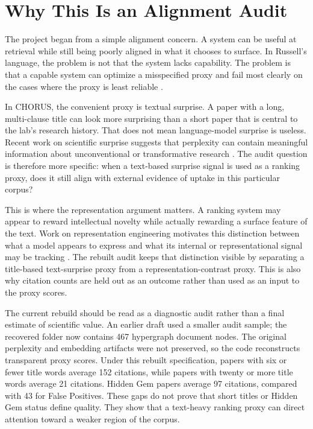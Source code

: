 \documentclass[11pt]{article}
\begin{document}
\section{Why This Is an Alignment Audit}

The project began from a simple alignment concern. A system can be useful at retrieval while still being poorly aligned in what it chooses to surface. In Russell's language, the problem is not that the system lacks capability. The problem is that a capable system can optimize a misspecified proxy and fail most clearly on the cases where the proxy is least reliable \citep{russell2021human}.

In CHORUS, the convenient proxy is textual surprise. A paper with a long, multi-clause title can look more surprising than a short paper that is central to the lab's research history. That does not mean language-model surprise is useless. Recent work on scientific surprise suggests that perplexity can contain meaningful information about unconventional or transformative research \citep{zhang2025perplexity}. The audit question is therefore more specific: when a text-based surprise signal is used as a ranking proxy, does it still align with external evidence of uptake in this particular corpus?

This is where the representation argument matters. A ranking system may appear to reward intellectual novelty while actually rewarding a surface feature of the text. Work on representation engineering motivates this distinction between what a model appears to express and what its internal or representational signal may be tracking \citep{zou2023representation}. The rebuilt audit keeps that distinction visible by separating a title-based text-surprise proxy from a representation-contrast proxy. This is also why citation counts are held out as an outcome rather than used as an input to the proxy scores.

The current rebuild should be read as a diagnostic audit rather than a final estimate of scientific value. An earlier draft used a smaller audit sample; the recovered folder now contains 467 hypergraph document nodes. The original perplexity and embedding artifacts were not preserved, so the code reconstructs transparent proxy scores. Under this rebuilt specification, papers with six or fewer title words average 152 citations, while papers with twenty or more title words average 21 citations. Hidden Gem papers average 97 citations, compared with 43 for False Positives. These gaps do not prove that short titles or Hidden Gem status define quality. They show that a text-heavy ranking proxy can direct attention toward a weaker region of the corpus.
\end{document}
